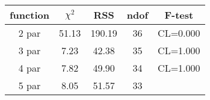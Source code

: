 \begin{tabular}{c|c|c|c|c}
function & $\chi^2$ & RSS & ndof & F-test \\
\hline
2 par & 51.13 & 190.19 & 36 & CL=0.000 \\
3 par & 7.23 & 42.38 & 35 & CL=1.000 \\
4 par & 7.82 & 49.90 & 34 & CL=1.000 \\
5 par & 8.05 & 51.57 & 33 & \\
\hline
\end{tabular}